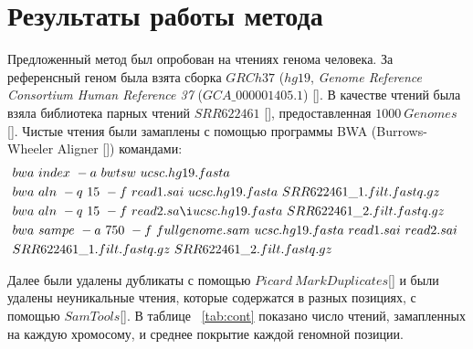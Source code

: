 \chapter{Результаты работы метода} 
\label{chapter3}

	Предложенный метод был опробован на чтениях генома человека. За референсный геном была взята сборка $GRCh37$ ($hg19$, \emph{Genome Reference Consortium Human Reference 37} ($GCA\_000001405.1$) []. В качестве чтений была взяла библиотека парных чтений $SRR622461$ [], предоставленная $1000\ Genomes$ [].
Чистые чтения были замаплены с помощью программы BWA (Burrows-Wheeler Aligner []) командами:
\begin{align*}
& bwa\ index\ -a\ bwtsw\ ucsc.hg19.fasta \\
& bwa\ aln\ -q\ 15\ -f\ read1.sai\ ucsc.hg19.fasta\ SRR622461\_1.filt.fastq.gz \\
& bwa\ aln\ -q\ 15\ -f\ read2.sa\i ucsc.hg19.fasta\ SRR622461\_2.filt.fastq.gz \\
& bwa\ sampe\ -a\ 750\  -f\ fullgenome.sam\ ucsc.hg19.fasta\ read1.sai\ read2.sai\ \\ 
& SRR622461\_1.filt.fastq.gz\ SRR622461\_2.filt.fastq.gz
\end{align*}

Далее были удалены дубликаты с помощью $Picard\ MarkDuplicates$[] и были удалены неуникальные чтения, которые содержатся в разных позициях, с помощью $SamTools$[]. В таблице ~\ref{tab:cont} показано число чтений, замапленных на каждую хромосому, и среднее покрытие каждой геномной позиции.

